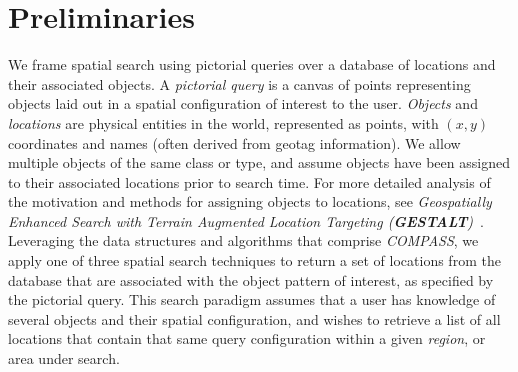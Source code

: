 \section{Preliminaries}
\label{section:prelim}

\par{
We frame spatial search using pictorial queries over a database of locations and their associated objects.
A \textit{pictorial query} is a canvas of points representing objects laid out in a spatial configuration of interest to the user.
\textit{Objects} and \textit{locations} are physical entities in the world, represented as points, with $(x,y)$ coordinates and names (often derived from geotag information).
We allow multiple objects of the same class or type, and assume objects have been assigned to their associated locations prior to search time.
For more detailed analysis of the motivation and methods for assigning objects to locations, see \textit{Geospatially Enhanced Search with Terrain Augmented Location Targeting (\textbf{GESTALT})}~\cite{Osul2023}.
Leveraging the data structures and algorithms that comprise \emph{COMPASS}, we apply one of three spatial search techniques to return a set of locations from the database that are associated with the object pattern of interest, as specified by the pictorial query. 
This search paradigm assumes that a user has knowledge of several objects and their spatial configuration, and wishes to retrieve a list of all locations that contain that same query configuration within a given \textit{region}, or area under search.
}

%

